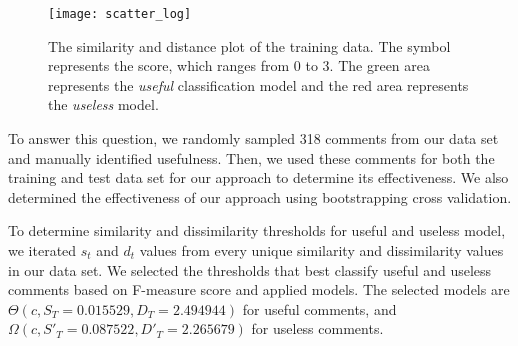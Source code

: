 \begin{figure}[!t]
\centering
\texttt{[image: scatter\_log]}
\caption{The similarity and distance plot of the training data.
The symbol represents the score, which ranges from 0 to 3.
The green area represents the \emph{useful} classification model and the red area represents the \emph{useless} model.}
\label{fig:scatter}
\end{figure}

To answer this question, we randomly sampled 318 comments from our data set and manually identified usefulness.
Then, we used these comments for both the training and test data set for our approach to determine its effectiveness.
We also determined the effectiveness of our approach using bootstrapping cross validation.


%

To determine similarity and dissimilarity thresholds for useful and useless model, we iterated $s_t$ and $d_t$ values from every unique similarity and dissimilarity values in our data set.
We selected the thresholds that best classify useful and useless comments based on F-measure score and applied models.
The selected models are $\Theta(c,S_T=0.015529,D_T=2.494944)$ for useful comments, and $\Omega(c,S'_T=0.087522,D'_T=2.265679)$ for useless comments.



